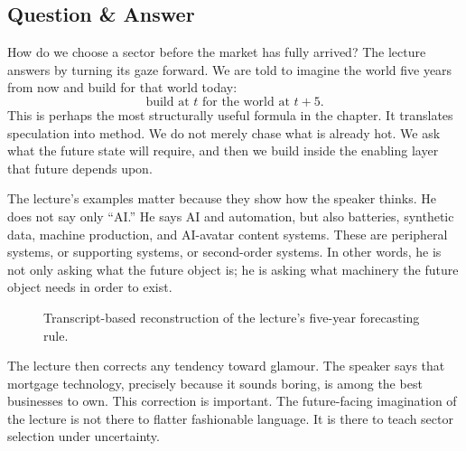 \subsection{Question \& Answer}

How do we choose a sector before the market has fully arrived? The lecture answers by turning its gaze forward. We are told to imagine the world five years from now and build for that world today:
\begin{equation}
\text{build at } t
\text{ for the world at } t+5.
\end{equation}
This is perhaps the most structurally useful formula in the chapter. It translates speculation into method. We do not merely chase what is already hot. We ask what the future state will require, and then we build inside the enabling layer that future depends upon.

The lecture's examples matter because they show how the speaker thinks. He does not say only ``AI.'' He says AI and automation, but also batteries, synthetic data, machine production, and AI-avatar content systems. These are peripheral systems, or supporting systems, or second-order systems. In other words, he is not only asking what the future object is; he is asking what machinery the future object needs in order to exist.

\begin{figure}[h]
\centering
{}
\caption{Transcript-based reconstruction of the lecture's five-year forecasting rule.}
\end{figure}

The lecture then corrects any tendency toward glamour. The speaker says that mortgage technology, precisely because it sounds boring, is among the best businesses to own. This correction is important. The future-facing imagination of the lecture is not there to flatter fashionable language. It is there to teach sector selection under uncertainty.

